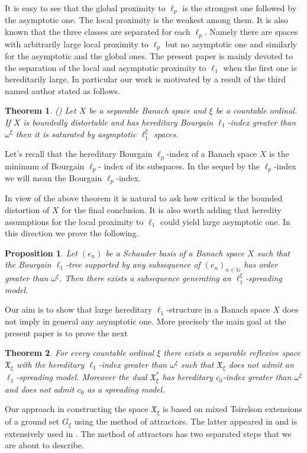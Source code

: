 \documentclass[a4paper]{amsart}
\theoremstyle{plain}
\newtheorem*{thrm}{Theorem}
\newtheorem*{prop}{Proposition}
\newcommand{\N}{\mathbb{N}}
\newcommand{\xn}[1][x]{(#1_{n})_{n\in\N}}
\begin{document}
It is easy to see that the global proximity to $\ell_p$ is the strongest one followed by
the asymptotic one. The local proximity  is the weakest among them. It is also known that
the three classes are separated for each $\ell_{p}$. Namely there are spaces with
arbitrarily large local proximity to $\ell_p$ but no asymptotic one and similarly for the
asymptotic and the global ones. The present paper is mainly devoted  to  the separation
of the local and asymptotic proximity to $\ell_{1}$ when the first one is hereditarily
large. In particular our work is motivated by a result of the third named author stated
as follows.
\begin{thrm} (\cite{P}) Let $X$ be a separable Banach space and $\xi$ be a
countable ordinal. If $X$ is boundedly distortable  and has hereditary Bourgain
$\ell_{1}$-index greater than  $\omega^{\xi}$  then it is saturated by asymptotic
$\ell_{1}^{\xi}$ spaces.
\end{thrm}
Let's recall that the  hereditary Bourgain $\ell_{p}$-index of a Banach space  $X$ is
the minimum  of   Bourgain $\ell_{p}$- index of its subspaces.  In the sequel by the
$\ell_{p}$-index we will mean the Bourgain $\ell_{p}$-index.


In view of the above theorem it is natural to ask how critical is
the bounded distortion of $X$ for the final conclusion. It is also worth  adding that heredity assumptions for the local proximity to $\ell_1$  could yield large asymptotic one. In this direction we prove the following.
\begin{prop} Let $(e_n)$ be a Schauder basis of a  Banach space $X$ such that
the Bourgain $\ell_{1}$-tree supported by any subsequence of
$\xn[e]$ has order greater than $\omega^{\xi}$.
Then  there exists a subsequence   generating an
$\ell_{1}^{\xi}$-spreading model.
\end{prop}
Our aim is to show that large hereditary $\ell_{1}$-structure in a Banach space $X$ does
not imply in general any asymptotic one. More precisely  the main goal at the present
paper is to prove the next
\begin{thrm}
For every countable ordinal $\xi$ there exists a separable reflexive space
$\mathfrak{X}_{\xi}$  with the hereditary  $\ell_{1}$-index greater than $\omega^{\xi}$
such that $\mathfrak{X}_{\xi}$ does not admit an $\ell_{1}$-spreading model. Moreover the
dual $\mathfrak{X}_{\xi}^{*}$  has  hereditary $c_0$-index greater than $\omega^{\xi}$
and does not admit $c_0$ as a spreading model.
\end{thrm}
Our approach in constructing the space $\mathfrak{X}_{\xi}$ is based on mixed Tsirelson
extensions of a ground set $G_{\xi}$ using the method of  attractors. The latter appeared
in \cite{AT} and is extensively used in \cite{AAT}. The method of  attractors has two
separated steps that we are about to describe.
\end{document}
